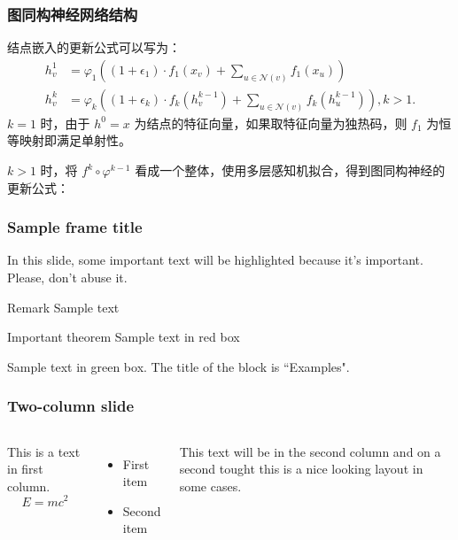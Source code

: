 \documentclass{beamer}
\begin{document}
\begin{frame}

  \frametitle{图同构神经网络结构}
  结点嵌入的更新公式可以写为：
  \begin{align*}
    h_v^1 &= \varphi_1((1 + \epsilon_1) \cdot f_1(x_v) + \sum_{u \in \mathcal{N}(v)} f_1(x_u)) \\
    h_v^k &= \varphi_k((1 + \epsilon_k) \cdot f_k(h^{k-1}_v) + \sum_{u \in \mathcal{N}(v)} f_k(h^{k-1}_u)), k > 1.
  \end{align*}
  $k = 1$ 时，由于 $h^0 = x$ 为结点的特征向量，如果取特征向量为独热码，则 $f_1$ 为恒等映射即满足单射性。

  $k > 1$ 时，将 $f^{k} \circ \varphi^{k-1}$ 看成一个整体，使用多层感知机拟合，得到图同构神经的更新公式：
  

\end{frame}



\begin{frame}
\frametitle{Sample frame title}

In this slide, some important text will be
\alert{highlighted} because it's important.
Please, don't abuse it.

\begin{block}{Remark}
Sample text
\end{block}

\begin{alertblock}{Important theorem}
Sample text in red box
\end{alertblock}

\begin{examples}
Sample text in green box. The title of the block is ``Examples".
\end{examples}
\end{frame}


\begin{frame}
\frametitle{Two-column slide}

\begin{columns}

This is a text in first column.
$$E=mc^2$$
\begin{itemize}
\item First item
\item Second item
\end{itemize}

This text will be in the second column
and on a second tought this is a nice looking
layout in some cases.
\end{columns}
\end{frame}
\end{document}
